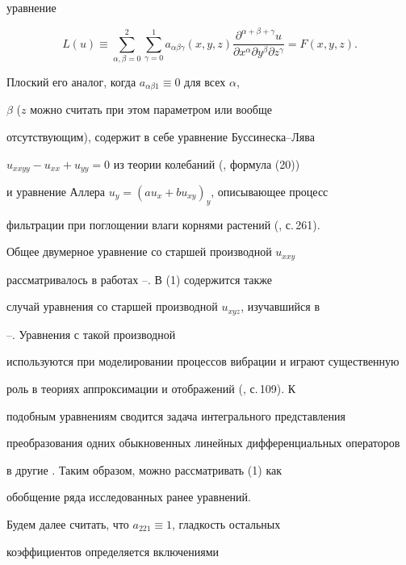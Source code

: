 уравнение 


\begin{equation} 


L(u)\equiv\sum^2_{\alpha,\beta=0}\sum^1_{\gamma=0} 


a_{\alpha\beta\gamma}(x,y,z) 


\frac{\partial^{\alpha+\beta+\gamma}u} 


{\partial x^\alpha\partial y^\beta\partial z^\gamma}= 


F(x,y,z). 


\end{equation} 


Плоский его аналог, когда $a_{\alpha\beta1}\equiv0$ для всех $\alpha$, 


$\beta$ ($z$ можно считать при этом параметром или вообще 


отсутствующим), содержит в себе уравнение Буссинеска--Лява 


$u_{xxyy}-u_{xx}+u_{yy}=0$ из теории колебаний (\cite{1}, формула (20)) 


и уравнение Аллера $u_y=(a u_x+b u_{xy})_y$, описывающее процесс 


фильтрации при поглощении влаги корнями растений (\cite{2}, с.\,261). 


Общее двумерное уравнение со старшей производной $u_{xxy}$ 


рассматривалось в работах \cite{3}--\cite{9}. В (1) содержится также 


случай уравнения со старшей производной $u_{xyz}$, изучавшийся в 


\cite{10}--\cite{12}. Уравнения с такой производной 


используются при моделировании процессов вибрации и играют существенную 


роль в теориях аппроксимации и отображений (\cite{13}, с.\,109). К 


подобным уравнениям сводится задача интегрального представления 


преобразования одних обыкновенных линейных дифференциальных операторов 


в другие \cite{14}. Таким образом, можно рассматривать (1) как 


обобщение ряда исследованных ранее уравнений. 


 


Будем далее считать, что $a_{221}\equiv1$, гладкость остальных 


коэффициентов определяется включениями 



